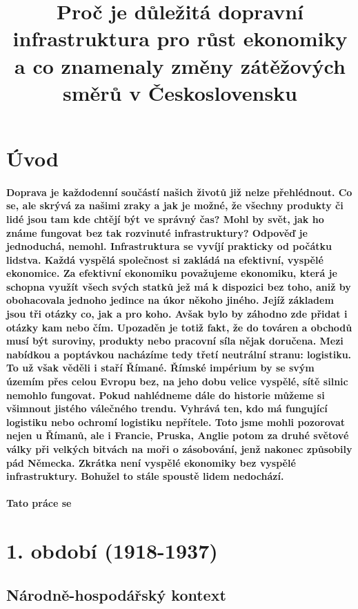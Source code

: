 \documentclass{article}
\title{\vspace{-2cm}Proč je důležitá dopravní infrastruktura pro růst ekonomiky a co znamenaly změny zátěžových směrů v Československu\vspace{-1.7cm}}
\date{}
\author{}
\begin{document}
\maketitle
\tableofcontents
\newpage
\section{Úvod}

\paragraph{\quad Doprava je každodenní součástí našich životů již nelze přehlédnout. Co se, ale skrývá za našimi zraky a jak je možné, že všechny produkty či lidé jsou tam kde chtějí být ve správný čas? Mohl by svět, jak ho známe fungovat bez tak rozvinuté infrastruktury? Odpověď je jednoduchá, nemohl. Infrastruktura se vyvíjí prakticky od počátku lidstva. Každá vyspělá společnost si zakládá na efektivní, vyspělé ekonomice. Za efektivní ekonomiku považujeme ekonomiku, která je schopna využít všech svých statků jež má k dispozici bez toho, aniž by obohacovala jednoho jedince na úkor někoho jiného. Jejíž základem jsou tři otázky co, jak a pro koho. Avšak bylo by záhodno zde přidat i otázky kam nebo čím. Upozaděn je totiž fakt, že do továren a obchodů musí být suroviny, produkty nebo pracovní síla nějak doručena. Mezi nabídkou a poptávkou nacházíme tedy třetí neutrální stranu: logistiku. To už však věděli i staří Římané. Římské impérium by se svým územím přes celou Evropu bez, na jeho dobu velice vyspělé, sítě silnic nemohlo fungovat. Pokud nahlédneme dále do historie můžeme si všimnout jistého válečného trendu. Vyhrává ten, kdo má fungující logistiku nebo ochromí logistiku nepřítele. Toto jsme mohli pozorovat nejen u Římanů, ale i Francie, Pruska, Anglie potom za druhé světové války při velkých bitvách na moři o zásobování, jenž nakonec způsobily pád Německa. Zkrátka není vyspělé ekonomiky bez vyspělé infrastruktury. Bohužel to stále spoustě lidem nedochází.
 }
\paragraph{\quad Tato práce se }


\section{1. období (1918-1937)}
\subsection{Národně-hospodářský kontext}
\end{document}
